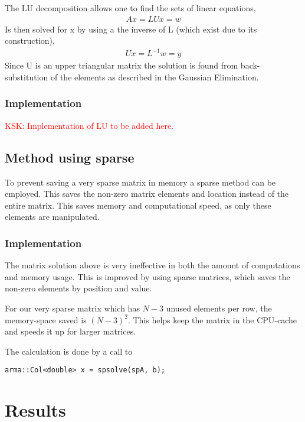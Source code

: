 \documentclass[11pt,a4paper,english,final]{article}
\numberwithin{equation}{section}
\begin{document}
The LU decomposition allows one to find the sets of linear equations,
\begin{gather}
Ax = LUx = w
\end{gather}
Is then solved for x by using a the inverse of L (which exist due to its 
construction), 
\begin{gather}
Ux = L^{-1}w = y
\end{gather}
Since U is an upper triangular matrix the solution is found from back-substitution
of the elements as described in the Gaussian Elimination.

\subsubsection{Implementation}

\textcolor{red}{KSK: Implementation of LU to be added here.}

\subsection{Method using sparse}

To prevent saving a very sparse matrix in memory a sparse method can be employed.
This saves the non-zero matrix elements and location instead of the 
entire matrix. This saves memory and computational speed, as only these
elements are manipulated.

\subsubsection{Implementation}

The matrix solution above is very ineffective in both the amount
of computations and memory usage. This is improved by using sparse 
matrices, which saves the non-zero elements by position and value.

For our very sparse matrix which has $N-3$ unused elements per row, the
memory-space saved is $(N-3)^2$. This helps keep the matrix in the 
CPU-cache and speeds it up for larger matrices.

The calculation is done by a call to
\begin{lstlisting}
arma::Col<double> x = spsolve(spA, b);
\end{lstlisting}

\section{Results}
\end{document}
